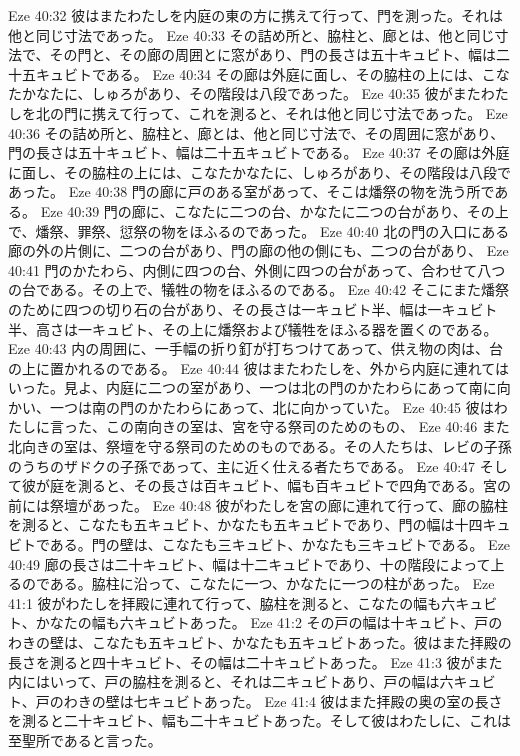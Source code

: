 Eze 40:32  彼はまたわたしを内庭の東の方に携えて行って、門を測った。それは他と同じ寸法であった。
Eze 40:33  その詰め所と、脇柱と、廊とは、他と同じ寸法で、その門と、その廊の周囲とに窓があり、門の長さは五十キュビト、幅は二十五キュビトである。
Eze 40:34  その廊は外庭に面し、その脇柱の上には、こなたかなたに、しゅろがあり、その階段は八段であった。
Eze 40:35  彼がまたわたしを北の門に携えて行って、これを測ると、それは他と同じ寸法であった。
Eze 40:36  その詰め所と、脇柱と、廊とは、他と同じ寸法で、その周囲に窓があり、門の長さは五十キュビト、幅は二十五キュビトである。
Eze 40:37  その廊は外庭に面し、その脇柱の上には、こなたかなたに、しゅろがあり、その階段は八段であった。
Eze 40:38  門の廊に戸のある室があって、そこは燔祭の物を洗う所である。
Eze 40:39  門の廊に、こなたに二つの台、かなたに二つの台があり、その上で、燔祭、罪祭、愆祭の物をほふるのであった。
Eze 40:40  北の門の入口にある廊の外の片側に、二つの台があり、門の廊の他の側にも、二つの台があり、
Eze 40:41  門のかたわら、内側に四つの台、外側に四つの台があって、合わせて八つの台である。その上で、犠牲の物をほふるのである。
Eze 40:42  そこにまた燔祭のために四つの切り石の台があり、その長さは一キュビト半、幅は一キュビト半、高さは一キュビト、その上に燔祭および犠牲をほふる器を置くのである。
Eze 40:43  内の周囲に、一手幅の折り釘が打ちつけてあって、供え物の肉は、台の上に置かれるのである。
Eze 40:44  彼はまたわたしを、外から内庭に連れてはいった。見よ、内庭に二つの室があり、一つは北の門のかたわらにあって南に向かい、一つは南の門のかたわらにあって、北に向かっていた。
Eze 40:45  彼はわたしに言った、この南向きの室は、宮を守る祭司のためのもの、
Eze 40:46  また北向きの室は、祭壇を守る祭司のためのものである。その人たちは、レビの子孫のうちのザドクの子孫であって、主に近く仕える者たちである。
Eze 40:47  そして彼が庭を測ると、その長さは百キュビト、幅も百キュビトで四角である。宮の前には祭壇があった。
Eze 40:48  彼がわたしを宮の廊に連れて行って、廊の脇柱を測ると、こなたも五キュビト、かなたも五キュビトであり、門の幅は十四キュビトである。門の壁は、こなたも三キュビト、かなたも三キュビトである。
Eze 40:49  廊の長さは二十キュビト、幅は十二キュビトであり、十の階段によって上るのである。脇柱に沿って、こなたに一つ、かなたに一つの柱があった。
Eze 41:1  彼がわたしを拝殿に連れて行って、脇柱を測ると、こなたの幅も六キュビト、かなたの幅も六キュビトあった。
Eze 41:2  その戸の幅は十キュビト、戸のわきの壁は、こなたも五キュビト、かなたも五キュビトあった。彼はまた拝殿の長さを測ると四十キュビト、その幅は二十キュビトあった。
Eze 41:3  彼がまた内にはいって、戸の脇柱を測ると、それは二キュビトあり、戸の幅は六キュビト、戸のわきの壁は七キュビトあった。
Eze 41:4  彼はまた拝殿の奥の室の長さを測ると二十キュビト、幅も二十キュビトあった。そして彼はわたしに、これは至聖所であると言った。
